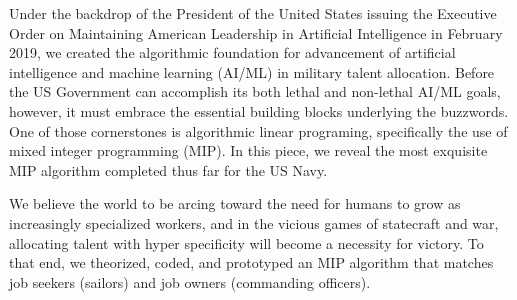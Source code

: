 Under the backdrop of the President of the United States issuing the Executive Order on Maintaining American Leadership in Artificial Intelligence in February 2019, we created the algorithmic foundation for advancement of artificial intelligence and machine learning (AI/ML) in military talent allocation.  Before the US Government can accomplish its both lethal and non-lethal AI/ML goals, however, it must embrace the essential building blocks underlying the buzzwords. One of those cornerstones is algorithmic linear programing, specifically the use of mixed integer programming (MIP).  In this piece, we reveal the most exquisite MIP algorithm completed thus far for the US Navy. 

We believe the world to be arcing toward the need for humans to grow as increasingly specialized workers, and in the vicious games of statecraft and war, allocating talent with hyper specificity will become a necessity for victory.  To that end, we theorized, coded, and prototyped an MIP algorithm that matches job seekers (sailors) and job owners (commanding officers).